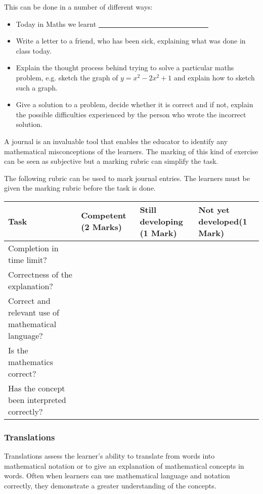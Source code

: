 This can be done in a number of different ways:
\begin{itemize}[noitemsep]
\item Today in Maths we learnt \underline{~~~~~~~~~~~~~~~~~~~~~~~~~~~~~~~} 
\item Write a letter to a friend, who has been sick, explaining what was done in class today.
\item Explain the thought process behind trying to solve a particular maths problem, e.g. sketch the graph of $ y = x^2 - 2x^2 + 1$ and explain how to sketch such a graph.
\item Give a solution to a problem, decide whether it is correct and if not, explain the possible difficulties experienced by the person who wrote the incorrect solution. 
\end{itemize}
A journal is an invaluable tool that enables the educator to identify any mathematical misconceptions of the learners. The marking of this kind of exercise can be seen as subjective but a marking rubric can simplify the task. 

The following rubric can be used to mark journal entries. The learners must be given the marking rubric before the task is done. 
\begin{table}[H]
 \begin{center}
  \begin{tabular}{|p{4cm}|p{2cm}|p{2.5cm}|p{3cm}|} \hline
  \textbf{Task} & \textbf{Competent \newline(2 Marks)} & \textbf{Still developing \newline(1 Mark)}& \textbf{Not yet developed\newline (1 Mark)}\\ \hline
Completion in time limit? &&&\\ \hline
Correctness of the explanation? &&&\\ \hline
Correct and relevant use of mathematical language? &&&\\ \hline
Is the mathematics correct? &&&\\ \hline
Has the concept been interpreted correctly?&&&\\ \hline

  \end{tabular}

 \end{center}

\end{table}


\subsubsection{Translations}
Translations assess the learner’s ability to translate from words into mathematical notation or to give an explanation of mathematical concepts in words. Often when learners can use mathematical language and notation correctly, they demonstrate a greater understanding of the concepts. \par 

